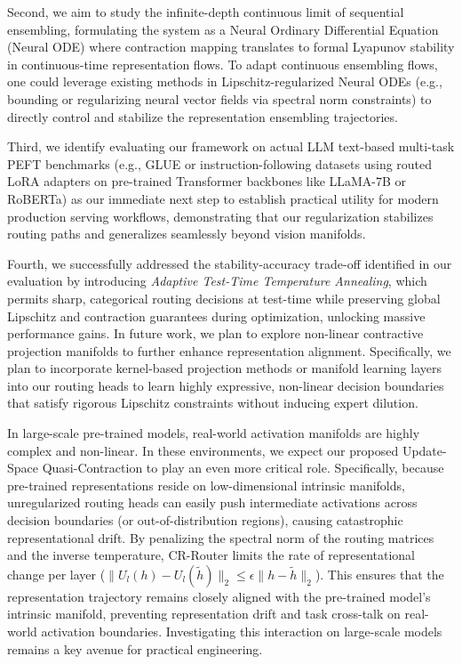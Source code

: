 Second, we aim to study the infinite-depth continuous limit of sequential ensembling, formulating the system as a Neural Ordinary Differential Equation (Neural ODE) where contraction mapping translates to formal Lyapunov stability in continuous-time representation flows. To adapt continuous ensembling flows, one could leverage existing methods in Lipschitz-regularized Neural ODEs (e.g., bounding or regularizing neural vector fields via spectral norm constraints) to directly control and stabilize the representation ensembling trajectories. 

Third, we identify evaluating our framework on actual LLM text-based multi-task PEFT benchmarks (e.g., GLUE or instruction-following datasets using routed LoRA adapters on pre-trained Transformer backbones like LLaMA-7B or RoBERTa) as our immediate next step to establish practical utility for modern production serving workflows, demonstrating that our regularization stabilizes routing paths and generalizes seamlessly beyond vision manifolds. 

Fourth, we successfully addressed the stability-accuracy trade-off identified in our evaluation by introducing \emph{Adaptive Test-Time Temperature Annealing}, which permits sharp, categorical routing decisions at test-time while preserving global Lipschitz and contraction guarantees during optimization, unlocking massive performance gains. In future work, we plan to explore non-linear contractive projection manifolds to further enhance representation alignment. Specifically, we plan to incorporate kernel-based projection methods or manifold learning layers into our routing heads to learn highly expressive, non-linear decision boundaries that satisfy rigorous Lipschitz constraints without inducing expert dilution.

In large-scale pre-trained models, real-world activation manifolds are highly complex and non-linear. In these environments, we expect our proposed Update-Space Quasi-Contraction to play an even more critical role. Specifically, because pre-trained representations reside on low-dimensional intrinsic manifolds, unregularized routing heads can easily push intermediate activations across decision boundaries (or out-of-distribution regions), causing catastrophic representational drift. By penalizing the spectral norm of the routing matrices and the inverse temperature, CR-Router limits the rate of representational change per layer ($\|U_l(h) - U_l(\tilde{h})\|_2 \le \epsilon \|h - \tilde{h}\|_2$). This ensures that the representation trajectory remains closely aligned with the pre-trained model's intrinsic manifold, preventing representation drift and task cross-talk on real-world activation boundaries. Investigating this interaction on large-scale models remains a key avenue for practical engineering.

